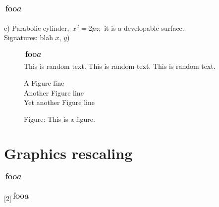 \documentclass{article}
\begin{document}
\begin{center}
\includegraphics{foo.png}
\bigskip

c) Parabolic cylinder, \,$x^2 = 2pz$;\, it is a developable surface. \\
Signatures: blah $x$, $y$)
\end{center}

\begin{figure}
\begin{center}
\includegraphics{foo}
\caption{This is random text. This is random text. This is random text.}
\end{center}
\end{figure}

\begin{figure}
\begin{center}
A Figure line\\
Another Figure line\\
Yet another Figure line\\
\caption{Figure: This is a figure.} 
\end{center}
\end{figure}


\section{Graphics rescaling}
\includegraphics{foo}

\scalebox{3}[2]{\includegraphics{foo}}
\end{document}
